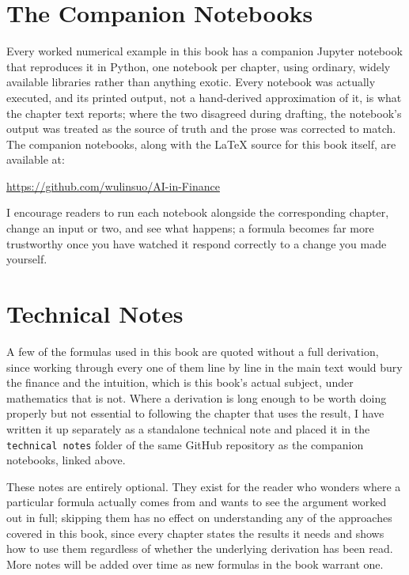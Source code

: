 \documentclass{book}
\begin{document}
\section*{The Companion Notebooks}

Every worked numerical example in this book has a companion Jupyter notebook that reproduces it in Python, one notebook per chapter, 
using ordinary, widely available libraries rather than anything exotic. Every notebook was actually executed, and its printed output, 
not a hand-derived approximation of it, is what the chapter text reports; where the two disagreed during drafting, the notebook's output 
was treated as the source of truth and the prose was corrected to match. The companion notebooks, along with the \LaTeX{} source for 
this book itself, are available at:

\begin{center}
\url{https://github.com/wulinsuo/AI-in-Finance}
\end{center}

I encourage readers to run each notebook alongside the corresponding chapter, change an input or two, and see what happens; a formula becomes far more trustworthy once you have watched it respond correctly to a change you made yourself.

\section*{Technical Notes}

A few of the formulas used in this book are quoted without a full derivation, since working through every one of them line by line in the main text would bury the finance and the intuition, which is this book's actual subject, under mathematics that is not. Where a derivation is long enough to be worth doing properly but not essential to following the chapter that uses the result, I have written it up separately as a standalone technical note and placed it in the \texttt{technical notes} folder of the same GitHub repository as the companion notebooks, linked above.

These notes are entirely optional. They exist for the reader who wonders where a particular formula actually comes from and wants to see the argument worked out in full; skipping them has no effect on understanding any of the approaches covered in this book, since every chapter states the results it needs and shows how to use them regardless of whether the underlying derivation has been read. More notes will be added over time as new formulas in the book warrant one.
\end{document}

